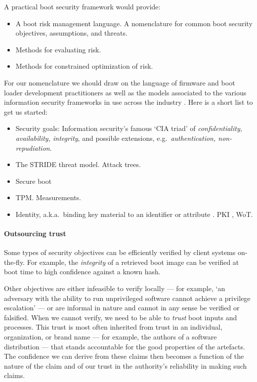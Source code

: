 A practical boot security framework would provide:
\begin{itemize}
  \item A boot risk management language. A nomenclature for common boot security objectives, assumptions, and threats.
  \item Methods for evaluating risk.
  \item Methods for constrained optimization of risk.
\end{itemize}
For our nomenclature we should draw on the language of firmware and boot loader development practitioners \cite{yao2020building} as well as the models associated to the various information security frameworks in use across the industry \cite{taherdoost2022understanding}. 
%
Here is a short list to get us started:
\begin{itemize}
  \item Security goals: Information security's famous `CIA triad' of \emph{confidentiality, availability, integrity}, and possible extensions, e.g.~\emph{authentication, non-repudiation}.
  \item The STRIDE threat model. Attack trees.
  \item Secure boot
  \item TPM. Measurements.
  \item Identity, a.k.a.~binding key material to an identifier or attribute . PKI \cite{rfc5280}, WoT.
\end{itemize}

\paragraph{Outsourcing trust}
Some types of security objectives can be efficiently verified by client systems on-the-fly.
%
For example, the \emph{integrity} of a retrieved boot image can be verified at boot time to high confidence against a known hash.

Other objectives are either infeasible to verify locally --- for example, `an adversary with the ability to run unprivileged software cannot achieve a privilege escalation' --- or are informal in nature and cannot in any sense be verified or falsified.
%
When we cannot verify, we need to be able to \emph{trust} boot inputs and processes.
%
This trust is most often inherited from trust in an individual, organization, or brand name --- for example, the authors of a software distribution --- that stands accountable for the good properties of the artefacts.
%
The confidence we can derive from these claims then becomes a function of the nature of the claim and of our trust in the authority's reliability in making such claims.

